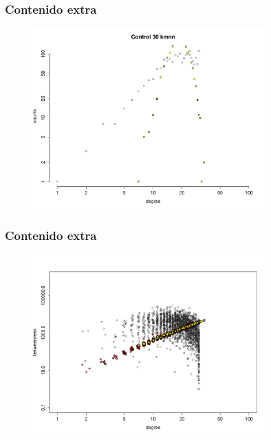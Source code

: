 \documentclass[serif,9pt, t]{beamer}
\begin{document}
\begin{frame}\frametitle{Contenido extra}
\begin{figure}
\centering
\includegraphics[width=0.8\textwidth]{erdos_renyi_vs_30kmnn}
\end{figure}
\end{frame}

\begin{frame}\frametitle{Contenido extra}
\begin{figure}
\centering
\includegraphics[width=0.8\textwidth]{betweenness_er_30_conf.pdf}
\end{figure}
\end{frame}
\end{document}
